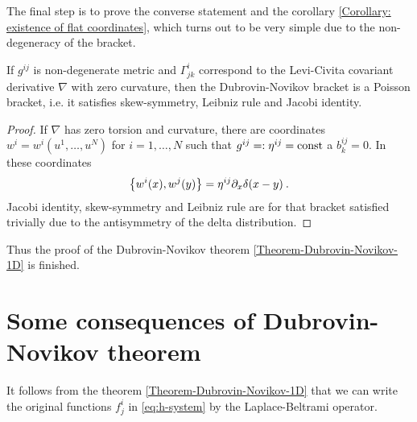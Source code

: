 The final step is to prove the converse statement and the corollary \vref{Corollary: existence of flat coordinates}, which turns out to be very simple due to the non-degeneracy of the bracket. 

\begin{lemma}
    If $g^{ij}$ is non-degenerate metric and $\Gamma^i_{jk}$ correspond to the Levi-Civita covariant derivative $\nabla$ with zero curvature, then the Dubrovin-Novikov bracket is a Poisson bracket, i.e. it satisfies skew-symmetry, Leibniz rule and Jacobi identity.
\end{lemma}

\begin{proof}
    If $\nabla$ has zero torsion and curvature, there are coordinates $w^i=w^i(u^1,\dots,u^N)$ for $i=1,\dots,N$ such that $g^{ij} =: \eta^{ij} =\mathrm{const}$ a $b^{ij}_k = 0$. In these coordinates
    \begin{align}
        \left \lbrace w^i(x),w^j(y) \right \rbrace = \eta^{ij} \partial_x \delta(x-y) \:.
    \end{align}
    Jacobi identity, skew-symmetry and Leibniz rule are for that bracket satisfied trivially due to the antisymmetry of the delta distribution.
\end{proof}
Thus the proof of the Dubrovin-Novikov theorem \vref{Theorem-Dubrovin-Novikov-1D} is finished.

\section{Some consequences of Dubrovin-Novikov theorem}

It follows from the theorem \vref{Theorem-Dubrovin-Novikov-1D} that we can write the original functions $f^{i}_j$ in \eqref{eq:h-system} by the Laplace-Beltrami operator.

